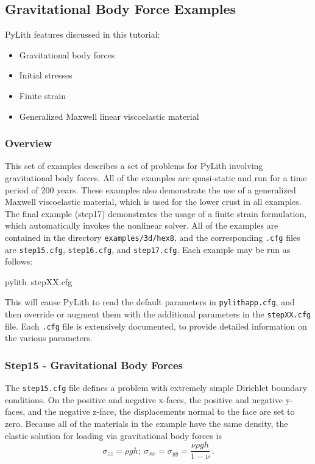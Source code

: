 
\subsection{\label{sec:example:3dhex8-gravity}Gravitational Body Force Examples}

PyLith features discussed in this tutorial:
\begin{itemize}
\item Gravitational body forces
\item Initial stresses
\item Finite strain
\item Generalized Maxwell linear viscoelastic material
\end{itemize}

\subsubsection{Overview}

This set of examples describes a set of problems for PyLith involving
gravitational body forces. All of the examples are quasi-static and
run for a time period of 200 years. These examples also demonstrate
the use of a generalized Maxwell viscoelastic material, which is used
for the lower crust in all examples. The final example (step17) demonstrates
the usage of a finite strain formulation, which automatically invokes
the nonlinear solver. All of the examples are contained in the directory
\texttt{examples/3d/hex8}, and the corresponding \texttt{.cfg} files
are \texttt{step15.cfg}, \texttt{step16.cfg}, and \texttt{step17.cfg}.
Each example may be run as follows:
\begin{lyxcode}
pylith~stepXX.cfg
\end{lyxcode}
This will cause PyLith to read the default parameters in \texttt{pylithapp.cfg},
and then override or augment them with the additional parameters in
the \texttt{stepXX.cfg} file. Each \texttt{.cfg} file is extensively
documented, to provide detailed information on the various parameters.


\subsubsection{Step15 - Gravitational Body Forces}

The \texttt{step15.cfg} file defines a problem with extremely simple
Dirichlet boundary conditions. On the positive and negative x-faces,
the positive and negative y-faces, and the negative z-face, the displacements
normal to the face are set to zero. Because all of the materials in
the example have the same density, the elastic solution for loading
via gravitational body forces is
\begin{equation}
\sigma_{zz}=\rho gh;\:\sigma_{xx}=\sigma_{yy}=\frac{\nu\rho gh}{1-\nu}\:.\label{eq:1-1}
\end{equation}


